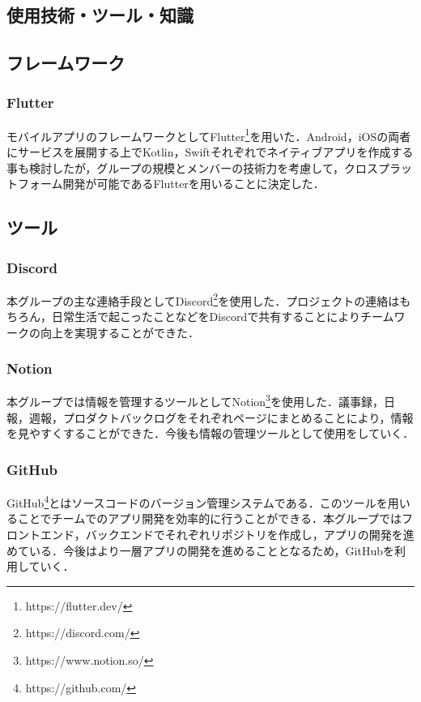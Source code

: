 \documentclass[openany,11pt,papersize,dvipdfm]{jsbook}
\begin{document}
\tableofcontents

\mainmatter






\begin{appendix}

\chapter{使用技術・ツール・知識}
\section{フレームワーク}
\subsection{Flutter}
モバイルアプリのフレームワークとしてFlutter\footnote{https://flutter.dev/}を用いた．Android，iOSの両者にサービスを展開する上でKotlin，Swiftそれぞれでネイティブアプリを作成する事も検討したが，グループの規模とメンバーの技術力を考慮して，クロスプラットフォーム開発が可能であるFlutterを用いることに決定した．

\section{ツール}
\subsection{Discord}
本グループの主な連絡手段としてDiscord\footnote{https://discord.com/}を使用した．プロジェクトの連絡はもちろん，日常生活で起こったことなどをDiscordで共有することによりチームワークの向上を実現することができた．
\subsection{Notion}
本グループでは情報を管理するツールとしてNotion\footnote{https://www.notion.so/}を使用した．議事録，日報，週報，プロダクトバックログをそれぞれページにまとめることにより，情報を見やすくすることができた．今後も情報の管理ツールとして使用をしていく．
\subsection{GitHub}
GitHub\footnote{https://github.com/}とはソースコードのバージョン管理システムである．このツールを用いることでチームでのアプリ開発を効率的に行うことができる．本グループではフロントエンド，バックエンドでそれぞれリポジトリを作成し，アプリの開発を進めている．今後はより一層アプリの開発を進めることとなるため，GitHubを利用していく．

\end{appendix}
\end{document}
